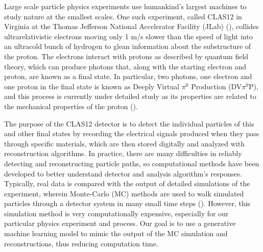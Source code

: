 Large scale particle physics experiments use humankind's largest machines to study nature at the smallest scales. One such experiment, called CLAS12 in Virginia at the Thomas Jefferson National Accelerator Facility (JLab) (\citet{BURKERT2020163419}), collides ultrarelativistic electrons moving only 1 m/s slower than the speed of light into an ultracold bunch of hydrogen to glean information about the substructure of the proton. The electrons interact with protons as described by quantum field theory, which can produce photons that, along with the starting electron and proton, are known as a final state. In particular, two photons, one electron and one proton in the final state is known as Deeply Virtual $\pi^0$ Production (DV$\pi^0$P), and this process is currently under detailed study as its properties are related to the mechanical properties of the proton (\citet{PhysRevD.55.7114}). 

The purpose of the CLAS12 detector is to detect the individual particles of this and other final states by recording the electrical signals produced when they pass through specific materials, which are then stored digitally and analyzed with reconstruction algorithms. In practice, there are many difficulties in reliably detecting and reconstructing particle paths, so computational methods have been developed to better understand detector and analysis algorithm's responses. Typically, real data is compared with the output of detailed simulations of the experiment, wherein Monte-Carlo (MC) methods are used to walk simulated particles through a detector system in many small time steps (\citet{PhysRevLett.115.212003, 10.1093/ptep/ptaa104}). However, this simulation method is very computationally expensive, especially for our particular physics experiment and process. Our goal is to use a generative machine learning model to mimic the output of the MC simulation and reconstructions, thus reducing computation time.


